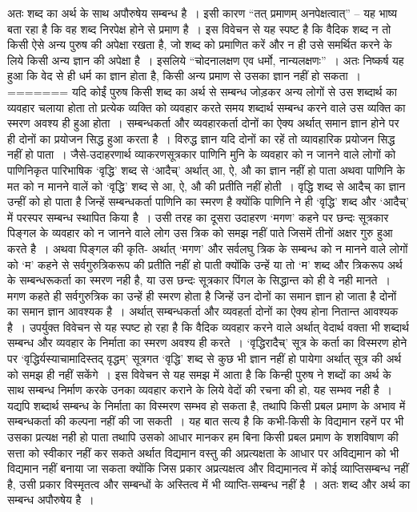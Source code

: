 अतः शब्द का अर्थ के साथ अपौरुषेय सम्बन्ध है~। इसी कारण “तत् प्रमाणम् अनपेक्षत्वात्” – यह भाष्य बता रहा है कि वह शब्द निरपेक्ष होने से प्रमाण है~। इस विवेचन से यह स्पष्ट है कि वैदिक शब्द न तो किसी ऐसे अन्य पुरुष की अपेक्षा रखता है, जो शब्द को प्रमाणित करें और न ही उसे समर्थित करने के लिये किसी अन्य ज्ञान की अपेक्षा है~। इसलिये “चोदनालक्षण एव धर्मो, नान्यलक्षणः”~। अतः निष्कर्ष यह हुआ कि वेद से ही धर्म का ज्ञान होता है, किसी अन्य प्रमाण से उसका ज्ञान नहीं हो सकता~।
=======
यदि कोईं पुरुष किसी शब्द का अर्थ से सम्बन्ध जोड़कर अन्य लोगों से उस शब्दार्थ का व्यवहार चलाया होता तो प्रत्येक व्यक्ति को व्यवहार करते समय शब्दार्थ सम्बन्ध करने वाले उस व्यक्ति का स्मरण अवश्य ही हुआ होता~। सम्बन्धकर्ता और व्यवहारकर्ता दोनों का ऐक्य अर्थात् समान ज्ञान होने पर ही दोनों का प्रयोजन सिद्ध हुआ करता है~। विरुद्ध ज्ञान यदि दोनों का रहें तो व्यावहारिक प्रयोजन सिद्ध नहीं हो पाता~। जैसे-उदाहरणार्थ व्याकरणसूत्रकार पाणिनि मुनि के व्यवहार को न जानने वाले लोगों को पाणिनिकृत पारिभाषिक ‘वृद्धि' शब्द से ‘आदैच्' अर्थात् आ, ऐ, औ का ज्ञान नहीं हो पाता अथवा पाणिनि के मत को न मानने वालें को ‘वृद्धि' शब्द से आ, ऐ, औ की प्रतीति नहीं होती~। वृद्धि शब्द से आदैच् का ज्ञान उन्हीं को हो पाता है जिन्हें सम्बन्धकर्ता पाणिनि का स्मरण है क्योंकि पाणिनि ने ही ‘वृद्धि' शब्द और ‘आदैच्' में परस्पर सम्बन्ध स्थापित किया है~। उसी तरह का दूसरा उदाहरण ‘मगण' कहने पर छन्दः सूत्रकार पिङ्गल के व्यवहार को न जानने वाले लोग उस त्रिक को समझ नहीं पाते जिसमें तीनों अक्षर गुरु हुआ करते है~। अथवा पिङ्गल की कृति- अर्थात् ‘मगण' और सर्वलघु त्रिक के सम्बन्ध को न मानने वाले लोगों को ‘म' कहने से सर्वगुरुत्रिकरूप की प्रतीति नहीं हो पाती क्योंकि उन्हें या तो ‘म' शब्द और त्रिकरूप अर्थ के सम्बन्धरूकर्ता का स्मरण नही है, या उस छन्दः सूत्रकार पिंगल के सिद्धान्त को ही वे नही मानते~। मगण कहते ही सर्वगुरुत्रिक का उन्हें ही स्मरण होता है जिन्हें उन दोनों का समान ज्ञान हो जाता है दोनों का समान ज्ञान आवश्यक है~। अर्थात् सम्बन्धकर्ता और व्यवहर्ता दोनों का ऐक्य होना नितान्त आवश्यक है~। उपर्युक्त विवेचन से यह स्पष्ट हो रहा है कि वैदिक व्यवहार करने वाले अर्थात् वेदार्थ वक्ता भी शब्दार्थ सम्बन्ध और व्यवहार के निर्माता का स्मरण अवश्य ही करते~। ‘वृद्धिरादैच्' सूत्र के कर्ता का विस्मरण होने पर ‘वृद्धिर्यस्याचामादिस्तद् वृद्धम्' सूत्रगत ‘वृद्धि' शब्द से कुछ भी ज्ञान नहीं हो पायेगा अर्थात् सूत्र की अर्थ को समझ ही नहीं सकेंगे~। इस विवेचन से यह समझ में आता है कि किन्ही पुरुष ने शब्दों का अर्थ के साथ सम्बन्ध निर्माण करके उनका व्यवहार कराने के लिये वेदों की रचना की हो, यह सम्भव नही है~। यद्यपि शब्दार्थ सम्बन्ध के निर्माता का विस्मरण सम्भव हो सकता है, तथापि किसी प्रबल प्रमाण के अभाव में सम्बन्धकर्ता की कल्पना नहीं की जा सकती~। यह बात सत्य है कि कभी-किसी के विद्यमान रहनें पर भी उसका प्रत्यक्ष नही हो पाता तथापि उसको आधार मानकर हम बिना किसी प्रबल प्रमाण के शशविषाण की सत्ता को स्वीकार नहीं कर सकते अर्थात विद्यमान वस्तु की अप्रत्यक्षता के आधार पर अविद्यमान को भी विद्यमान नहीं बनाया जा सकता क्योंकि जिस प्रकार अप्रत्यक्षत्व और विद्यमानत्व में कोई व्याप्तिसम्बन्ध नहीं है, उसी प्रकार विस्मृतत्व और सम्बन्धों के अस्तित्व में भी व्याप्ति-सम्बन्ध नहीं है~। अतः शब्द और अर्थ का सम्बन्ध अपौरुषेय है~।


